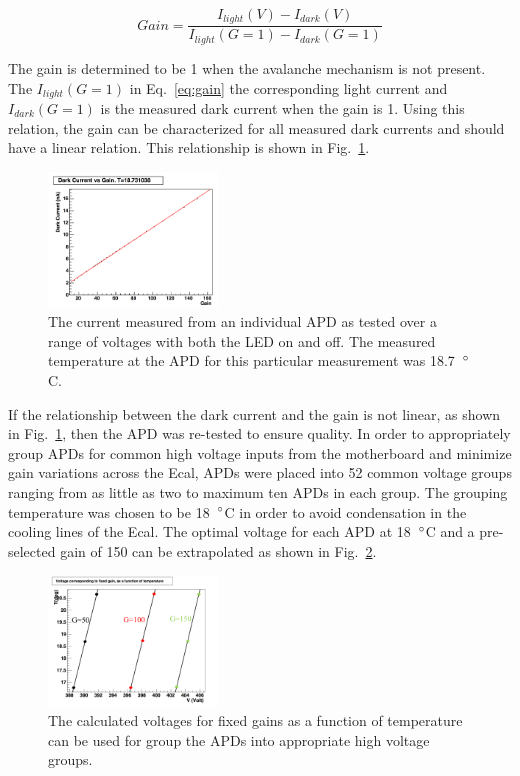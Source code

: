 \documentclass[12pt]{report}
\begin{document}
\begin{equation}
	\label{eq:apdgain}
	Gain = \dfrac{I_{light}(V)-I_{dark}(V)}{I_{light}(G=1)-I_{dark}(G=1)} 
\end{equation}

The gain is determined to be 1 when the avalanche mechanism is not present. The $I_{light}(G=1)$ in Eq.~\eqref{eq:gain} the corresponding light current and $I_{dark}(G=1)$ is the measured dark current when the gain is 1. Using this relation, the gain can be characterized for all measured dark currents and should have a linear relation. This relationship is shown in Fig.~\ref{Figure:apdIvG}.

\begin{figure}[H]
  \centering
      \includegraphics[width=0.4\textwidth]{pics/experiment/apdIvG.png}
  \caption[APD measured dark current as a function of gain]{The current measured from an individual APD as tested over a range of voltages with both the LED on and off. The measured temperature at the APD for this particular measurement was 18.7~$\degree$C.}
  \label{Figure:apdIvG}
\end{figure}

If the relationship between the dark current and the gain is not linear, as shown in Fig.~\ref{Figure:apdIvG}, then the APD was re-tested to ensure quality. In order to appropriately group APDs for common high voltage inputs from the motherboard and minimize gain variations across the Ecal, APDs were placed into 52 common voltage groups ranging from as little as two to maximum ten APDs in each group. The grouping temperature was chosen to be 18~$\degree$C in order to avoid condensation in the cooling lines of the Ecal. The optimal voltage for each APD at 18~$\degree$C and a pre-selected gain of 150 can be extrapolated as shown in Fig.~\ref{Figure:apdTV}.


\begin{figure}[H]
  \centering
      \includegraphics[width=0.4\textwidth]{pics/experiment/apdTV.png}
  \caption[APD fixed gain in terms of voltage and temperature]{The calculated voltages for fixed gains as a function of temperature can be used for group the APDs into appropriate high voltage groups.}
  \label{Figure:apdTV}
\end{figure}
\end{document}

